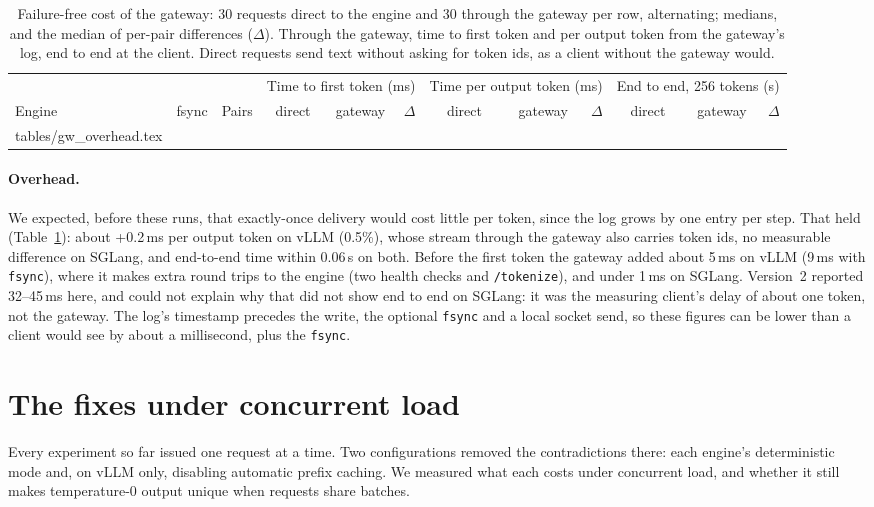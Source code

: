 \documentclass[10pt,twocolumn]{article}
\makeatletter
\def\GwOverheadRows{\@@input tables/gw_overhead.tex }
\makeatother
\begin{document}
\begin{table}[t]
\centering\small
\caption{Failure-free cost of the gateway: 30 requests direct to the engine
and 30 through the gateway per row, alternating; medians, and the median of
per-pair differences ($\Delta$). Through the gateway, time to first token and
per output token from the gateway's log, end to end at the client. Direct
requests send text without asking for token ids, as a client without the
gateway would.}
\label{tab:gwoverhead}
\begin{tabular}{@{}llrrrrrrrrrr@{}}
\toprule
 & & & \multicolumn{3}{c}{Time to first token (ms)} & \multicolumn{3}{c}{Time per output token (ms)} & \multicolumn{3}{c}{End to end, 256 tokens (s)} \\
\cmidrule(lr){4-6}\cmidrule(lr){7-9}\cmidrule(l){10-12}
Engine & fsync & Pairs & direct & gateway & $\Delta$ & direct & gateway & $\Delta$ & direct & gateway & $\Delta$ \\
\midrule
\GwOverheadRows
\bottomrule
\end{tabular}
\end{table}

\paragraph{Overhead.} We expected, before these runs, that exactly-once
delivery would cost little per token, since the log grows by one entry per
step. That held (Table~\ref{tab:gwoverhead}): about +0.2\,ms per output token
on vLLM (0.5\%), whose stream through the gateway also carries token ids, no
measurable difference on SGLang, and end-to-end time within 0.06\,s on both.
Before the first token the gateway added about 5\,ms on vLLM (9\,ms with
\texttt{fsync}), where it makes extra round trips to the engine (two health
checks and \texttt{/tokenize}), and under 1\,ms on SGLang. Version~2 reported
32--45\,ms here, and could not explain why that did not show end to end on
SGLang: it was the measuring client's delay of about one token, not the
gateway. The log's timestamp precedes the write, the optional \texttt{fsync}
and a local socket send, so these figures can be lower than a client would
see by about a millisecond, plus the \texttt{fsync}.

\section{The fixes under concurrent load}
\label{sec:load}

Every experiment so far issued one request at a time. Two configurations
removed the contradictions there: each engine's deterministic mode and, on
vLLM only, disabling automatic prefix caching. We measured what each costs
under concurrent load, and whether it still makes temperature-0 output unique
when requests share batches.
\end{document}
